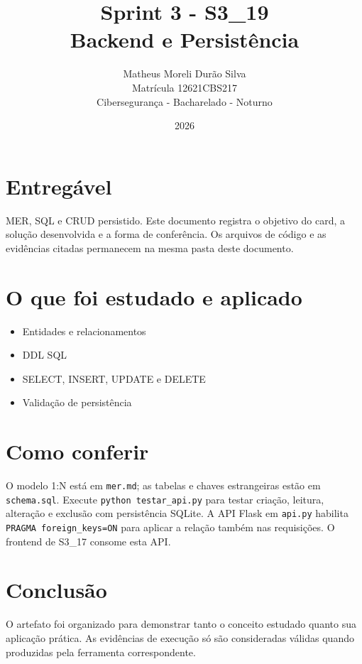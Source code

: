 \documentclass[12pt]{article}
\title{Sprint 3 - S3\_19\\Backend e Persistência}
\author{Matheus Moreli Durão Silva\\Matrícula 12621CBS217\\Cibersegurança - Bacharelado - Noturno}
\date{2026}
\begin{document}
\maketitle

\section*{Entregável}
MER, SQL e CRUD persistido. Este documento registra o objetivo do card, a solução desenvolvida e a forma de conferência. Os arquivos de código e as evidências citadas permanecem na mesma pasta deste documento.

\section*{O que foi estudado e aplicado}
\begin{itemize}
\item Entidades e relacionamentos
\item DDL SQL
\item SELECT, INSERT, UPDATE e DELETE
\item Validação de persistência
\end{itemize}

\section*{Como conferir}
O modelo 1:N está em \texttt{mer.md}; as tabelas e chaves estrangeiras estão em \texttt{schema.sql}. Execute \texttt{python testar\_api.py} para testar criação, leitura, alteração e exclusão com persistência SQLite. A API Flask em \texttt{api.py} habilita \texttt{PRAGMA foreign\_keys=ON} para aplicar a relação também nas requisições. O frontend de S3\_17 consome esta API.

\section*{Conclusão}
O artefato foi organizado para demonstrar tanto o conceito estudado quanto sua aplicação prática. As evidências de execução só são consideradas válidas quando produzidas pela ferramenta correspondente.
\end{document}
